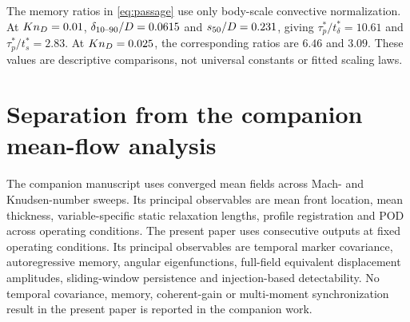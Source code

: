 The memory ratios in \cref{eq:passage} use only body-scale convective normalization. At $Kn_D=0.01$, $\delta_{10\text{--}90}/D=0.0615$ and $s_{50}/D=0.231$, giving $\tau_p^*/t_\delta^*=10.61$ and $\tau_p^*/t_s^*=2.83$. At $Kn_D=0.025$, the corresponding ratios are $6.46$ and $3.09$. These values are descriptive comparisons, not universal constants or fitted scaling laws.

\section{Separation from the companion mean-flow analysis}
The companion manuscript \citep{RoohiShoja2026Mean} uses converged mean fields across Mach- and Knudsen-number sweeps. Its principal observables are mean front location, mean thickness, variable-specific static relaxation lengths, profile registration and POD across operating conditions. The present paper uses consecutive outputs at fixed operating conditions. Its principal observables are temporal marker covariance, autoregressive memory, angular eigenfunctions, full-field equivalent displacement amplitudes, sliding-window persistence and injection-based detectability. No temporal covariance, memory, coherent-gain or multi-moment synchronization result in the present paper is reported in the companion work.
